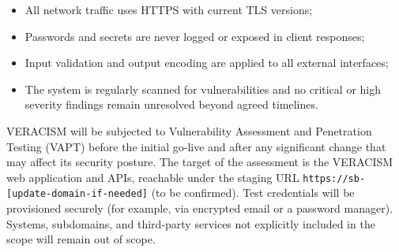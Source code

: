 \begin{itemize}
  \item All network traffic uses HTTPS with current TLS versions;
  \item Passwords and secrets are never logged or exposed in client responses;
  \item Input validation and output encoding are applied to all external interfaces;
  \item The system is regularly scanned for vulnerabilities and no critical or high
        severity findings remain unresolved beyond agreed timelines.
\end{itemize}

VERACISM will be subjected to Vulnerability Assessment and Penetration Testing
(VAPT) before the initial go-live and after any significant change that may
affect its security posture. The target of the assessment is the VERACISM web
application and APIs, reachable under the staging URL
\texttt{https://sb-[update-domain-if-needed]} (to be confirmed). Test
credentials will be provisioned securely (for example, via encrypted email or
a password manager). Systems, subdomains, and third-party services not
explicitly included in the scope will remain out of scope.

